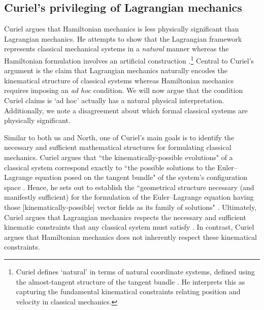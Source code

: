 \documentclass[letterpaper]{article}
\begin{document}
\subsection{Curiel's privileging of Lagrangian mechanics}
\label{Curiel}


Curiel \parencites*[]{Curiel} argues that Hamiltonian mechanics is less physically significant than Lagrangian mechanics. He attempts to show that the Lagrangian framework represents classical mechanical systems in a \textit{natural} manner whereas the Hamiltonian formulation involves an artificial construction \parencites*[270]{Curiel}.\footnote{Curiel defines `natural' in terms of natural coordinate systems, defined using the almost-tangent structure of the tangent bundle \parencites*[290-291]{Curiel}. He interprets this as capturing the fundamental kinematical constraints relating position and velocity in classical mechanics.} Central to Curiel's argument is the claim that Lagrangian mechanics naturally encodes the kinematical structure of classical systems whereas Hamiltonian mechanics requires imposing an \textit{ad hoc} condition. We will now argue that the condition Curiel claims is `ad hoc' actually has a natural physical interpretation. Additionally, we note a disagreement about which formal classical systems are physically significant.

Similar to both us and North, one of Curiel's main goals is to identify the necessary and sufficient mathematical structures for formulating classical mechanics. Curiel argues that ``the kinematically-possible evolutions" of a classical system correspond exactly to ``the possible solutions to the Euler--Lagrange equation posed on the tangent bundle" of the system's configuration space \parencites*[292]{Curiel}. Hence, he sets out to establish the ``geometrical structure necessary (and manifestly sufficient) for the formulation of the Euler--Lagrange equation having those [kinematically-possible] vector fields as its family of solutions" \parencites*[292]{Curiel}. Ultimately, Curiel argues that Lagrangian mechanics respects the necessary and sufficient kinematic constraints that any classical system must satisfy \parencites*[307-308]{Curiel}. In contrast, Curiel argues that Hamiltonian mechanics does not inherently respect these kinematical constraints.
\end{document}
